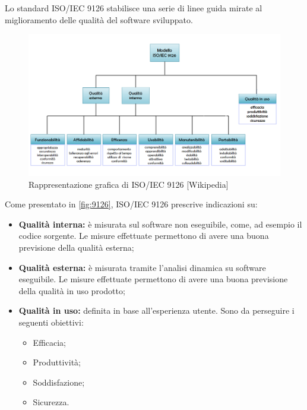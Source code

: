 Lo standard ISO/IEC 9126 stabilisce una serie di linee guida mirate al miglioramento delle qualità del software sviluppato.

\begin{figure}[H]
  \includegraphics[width=\linewidth]{sez/App_Qualita/grafico_9126.png}
  \caption{Rappresentazione grafica di ISO/IEC 9126 [Wikipedia]}
  \label{fig:9126}
\end{figure}

Come presentato in \autoref{fig:9126}, ISO/IEC 9126 prescrive indicazioni su:
\begin{itemize}
	\item \textbf{Qualità interna: }è misurata sul software non eseguibile, come, ad esempio il codice sorgente. Le misure effettuate permettono di avere una buona previsione della qualità esterna;
	\item \textbf{Qualità esterna: }è misurata tramite l'analisi dinamica su software eseguibile. Le misure effettuate permettono di avere una buona previsione della qualità in uso prodotto;
	\item \textbf{Qualità in uso: }definita in base all'esperienza utente. Sono da perseguire i seguenti obiettivi:
		\begin{itemize}
			\item Efficacia;
			\item Produttività;
			\item Soddisfazione;
			\item Sicurezza.
		\end{itemize}
\end{itemize}


